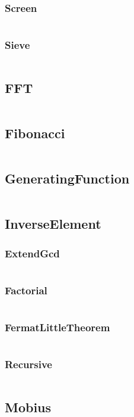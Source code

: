 \documentclass[a4paper,11pt]{article}
\begin{document}
\subsubsection{Screen}
\inputminted[breaklines]{c++}{02++Math/+Euler/+Screen.cpp}
\subsubsection{Sieve}
\inputminted[breaklines]{c++}{02++Math/+Euler/+Sieve.cpp}

\subsection{FFT}
\inputminted[breaklines]{c++}{02++Math/+FFT.cpp}
\subsection{Fibonacci}
\inputminted[breaklines]{c++}{02++Math/+Fibonacci.cpp}
\subsection{GeneratingFunction}
\inputminted[breaklines]{c++}{02++Math/+GeneratingFunction.cpp}
\subsection{InverseElement}
\subsubsection{ExtendGcd}
\inputminted[breaklines]{c++}{02++Math/+InverseElement/+ExtendGcd.cpp}
\subsubsection{Factorial}
\inputminted[breaklines]{c++}{02++Math/+InverseElement/+Factorial.cpp}
\subsubsection{FermatLittleTheorem}
\inputminted[breaklines]{c++}{02++Math/+InverseElement/+FermatLittleTheorem.cpp}
\subsubsection{Recursive}
\inputminted[breaklines]{c++}{02++Math/+InverseElement/+Recursive.cpp}

\subsection{Mobius}
\inputminted[breaklines]{c++}{02++Math/+Mobius.cpp}
\end{document}
